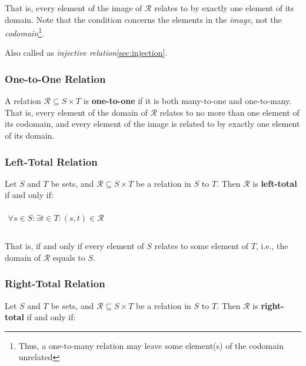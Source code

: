 That is, every element of the image of $\mathcal{R}$ relates to by
exactly one element of its domain. Note that the condition concerns
the elements in the \textit{image}, not the
\textit{codomain}\footnote{Thus, a one-to-many relation may leave some
  element(s) of the codomain unrelated}.

Also called as \textit{injective relation}\ref{sec:injection}.



\subsubsection{One-to-One Relation}
\label{sec:one-to-one}

A relation $\mathcal{R} \subseteq S \times T$ is \textbf{one-to-one}
if it is both many-to-one and one-to-many. That is, every element of
the domain of $\mathcal{R}$ relates to no more than one element of its
codomain, and every element of the image is related to by exactly one
element of its domain.



\subsubsection{Left-Total Relation}
\label{sec:left-total}

Let $S$ and $T$ be sets, and $\mathcal{R} \subseteq S \times T$ be a
relation in $S$ to $T$. Then $\mathcal{R}$ is \textbf{left-total} if
and only if:

\begin{math}
  \begin{array}{c}
    \\
    \forall s \in S: \exists t \in T: (s, t) \in \mathcal{R} \\
    \\
  \end{array}
\end{math}

That is, if and only if every element of $S$ relates to some element
of $T$, i.e., the domain of $\mathcal{R}$ equals to $S$.

\subsubsection{Right-Total Relation}
\label{sec:right-total}

Let $S$ and $T$ be sets, and $\mathcal{R} \subseteq S \times T$ be a
relation in $S$ to $T$. Then $\mathcal{R}$ is \textbf{right-total} if
and only if:

